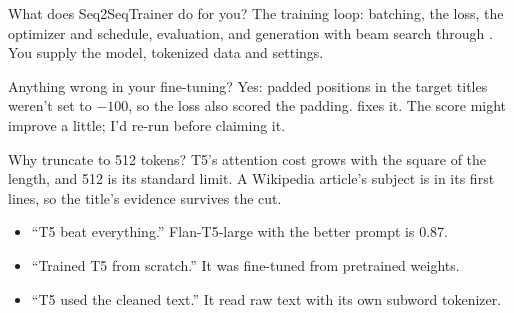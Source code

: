 \begin{iq}{What does Seq2SeqTrainer do for you?}
The training loop: batching, the loss, the optimizer and schedule, evaluation, and generation with beam search through . You supply the model, tokenized data and settings.
\end{iq}

\begin{iq}{Anything wrong in your fine-tuning?}
Yes: padded positions in the target titles weren't set to $-100$, so the loss also scored the padding.  fixes it. The score might improve a little; I'd re-run before claiming it.
\end{iq}

\begin{iq}{Why truncate to 512 tokens?}
T5's attention cost grows with the square of the length, and 512 is its standard limit. A Wikipedia article's subject is in its first lines, so the title's evidence survives the cut.
\end{iq}

\begin{bugfix}
\begin{itemize}
  \item ``T5 beat everything.'' Flan-T5-large with the better prompt is 0.87.
  \item ``Trained T5 from scratch.'' It was fine-tuned from pretrained weights.
  \item ``T5 used the cleaned text.'' It read raw text with its own subword tokenizer.
\end{itemize}
\end{bugfix}
